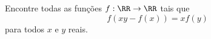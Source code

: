 Encontre todas as funções $f : \RR \to \RR$ tais que
$$f (xy - f (x)) = xf(y)$$
para todos $x$ e $y$ reais.
